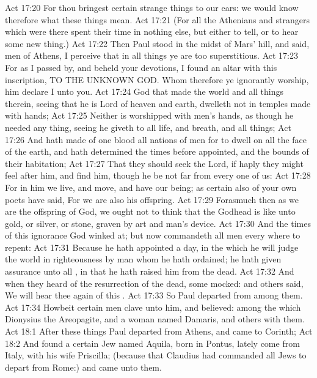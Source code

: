 \vs Act 17:20 For thou bringest certain strange things to our ears: we would know therefore what these things mean.
\vs Act 17:21 (For all the Athenians and strangers which were there spent their time in nothing else, but either to tell, or to hear some new thing.)
\vs Act 17:22 Then Paul stood in the midst of Mars' hill, and said,  men of Athens, I perceive that in all things ye are too superstitious.
\vs Act 17:23 For as I passed by, and beheld your devotions, I found an altar with this inscription, TO THE UNKNOWN GOD. Whom therefore ye ignorantly worship, him declare I unto you.
\vs Act 17:24 God that made the world and all things therein, seeing that he is Lord of heaven and earth, dwelleth not in temples made with hands;
\vs Act 17:25 Neither is worshipped with men's hands, as though he needed any thing, seeing he giveth to all life, and breath, and all things;
\vs Act 17:26 And hath made of one blood all nations of men for to dwell on all the face of the earth, and hath determined the times before appointed, and the bounds of their habitation;
\vs Act 17:27 That they should seek the Lord, if haply they might feel after him, and find him, though he be not far from every one of us:
\vs Act 17:28 For in him we live, and move, and have our being; as certain also of your own poets have said, For we are also his offspring.
\vs Act 17:29 Forasmuch then as we are the offspring of God, we ought not to think that the Godhead is like unto gold, or silver, or stone, graven by art and man's device.
\vs Act 17:30 And the times of this ignorance God winked at; but now commandeth all men every where to repent:
\vs Act 17:31 Because he hath appointed a day, in the which he will judge the world in righteousness by  man whom he hath ordained;  he hath given assurance unto all , in that he hath raised him from the dead.
\vs Act 17:32 And when they heard of the resurrection of the dead, some mocked: and others said, We will hear thee again of this .
\vs Act 17:33 So Paul departed from among them.
\vs Act 17:34 Howbeit certain men clave unto him, and believed: among the which  Dionysius the Areopagite, and a woman named Damaris, and others with them.
\vs Act 18:1 After these things Paul departed from Athens, and came to Corinth;
\vs Act 18:2 And found a certain Jew named Aquila, born in Pontus, lately come from Italy, with his wife Priscilla; (because that Claudius had commanded all Jews to depart from Rome:) and came unto them.
